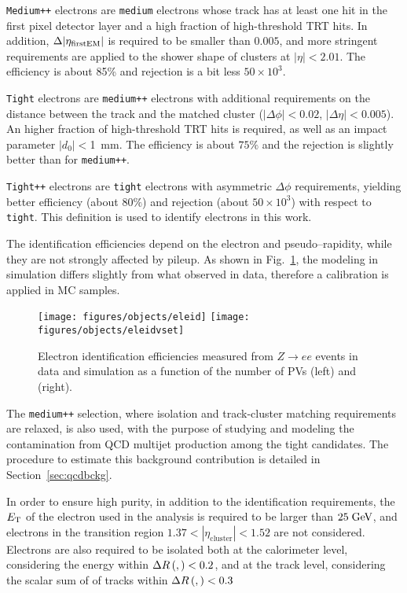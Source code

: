 \texttt{Medium++} electrons are \texttt{medium} electrons whose track
has at least one hit in the first pixel detector layer and a high
fraction of high-threshold TRT hits. In addition, $\Delta|\eta_{\rm
  first EM}|$ is required to be smaller than $0.005$, and more
stringent requirements are applied to the shower shape of clusters at
$|\eta|<2.01$. The efficiency is about 85\% and rejection is a bit
less $50\times 10^3$.

\texttt{Tight} electrons are \texttt{medium++} electrons with
additional requirements on the distance between the track and the
matched cluster ($|\Delta\phi|<0.02$, $|\Delta\eta|<0.005$). 
 An higher fraction of high-threshold TRT hits is required, as well as
 an impact parameter $|d_0|<$1~mm. 
The efficiency is about $75\%$ and the rejection is slightly better
than for \texttt{medium++}.

\texttt{Tight++} electrons are \texttt{tight} electrons with
asymmetric $\Delta\phi$ requirements, yielding better efficiency
(about $80\%$) and rejection (about $50\times 10^3$) with respect to
\texttt{tight}. This definition is used to identify electrons in this
work.

The identification efficiencies depend on the electron \pt{} and
pseudo--rapidity, while they are not strongly affected by pileup. As
shown in Fig.~\ref{fig:eleeff}, the modeling in simulation differs
slightly from what observed in data, therefore a calibration is
applied in MC samples.

\begin{figure}[htb!]\centering
  \texttt{[image: figures/objects/eleid]}
  \texttt{[image: figures/objects/eleidvset]}
  \caption{Electron identification efficiencies measured from
    $Z\to ee$ events in data and simulation as a function of the
    number of PVs (left) and ~\et{} (right).}
  \label{fig:eleeff}
\end{figure}

The \texttt{medium++} selection, where isolation and track-cluster matching
requirements are relaxed, is also used, with the purpose of studying
and modeling the contamination from QCD multijet production among the
tight candidates.
The procedure to estimate this background
contribution is detailed in Section~\ref{sec:qcdbckg}.

In order to ensure high purity, in addition to the identification
requirements, the $\mbox{\ensuremath{E_{\mathrm{T}}}}$ of the electron used in the analysis is required
to be larger than \mbox{$25 \; \mathrm{GeV}{}$}, and electrons in the transition
region $1.37<|\eta_{\mathrm{cluster}}|<1.52$ are not
considered. Electrons are also required to be isolated both at the
calorimeter level, considering the energy within $\Delta{}R\left(, \right)<0.2$,
and at the track level, considering the scalar sum of \pt{} of tracks
within $\Delta{}R\left(, \right)<0.3$

